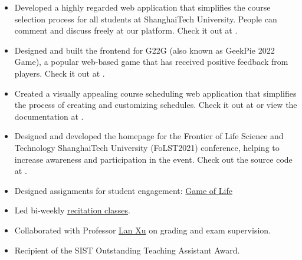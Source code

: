 \documentclass{resume}
\begin{document}

\begin{itemize}
  \item Developed a highly regarded web application that simplifies the course selection process for all students at ShanghaiTech University. People can comment and discuss freely at our platform. Check it out at .
  \item Designed and built the frontend for G22G (also known as GeekPie 2022 Game), a popular web-based game that has received positive feedback from players. Check it out at .
  \item Created a visually appealing course scheduling web application that simplifies the process of creating and customizing schedules. Check it out at  or view the documentation at .
  \item Designed and developed the homepage for the Frontier of Life Science and Technology ShanghaiTech University (FoLST2021) conference, helping to increase awareness and participation in the event. Check out the source code at .
\end{itemize}


\begin{itemize}
  \item Designed assignments for student engagement: \href{https://github.com/Clarivy/GameOfLife-Homework}{Game of Life}
  \item Led bi-weekly \href{https://github.com/GKxxQAQ/CS100-recitations-spring2023}{recitation classes}.
  \item Collaborated with Professor \href{https://www.xu-lan.com/}{Lan Xu} on grading and exam supervision.
  \item Recipient of the SIST Outstanding Teaching Assistant Award.
\end{itemize}

\end{document}

